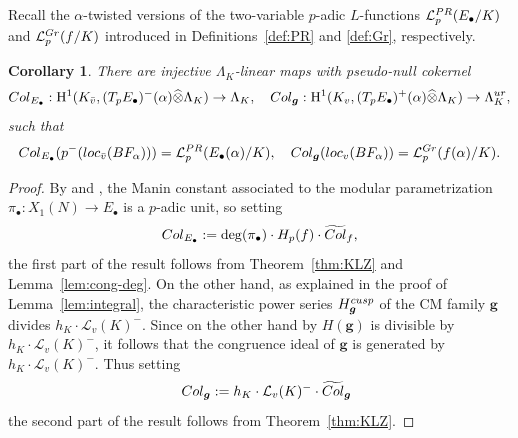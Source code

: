 \documentclass[a4paper,10pt]{amsart}
\numberwithin{equation}{section}
\numberwithin{equation}{section}
\theoremstyle{plain}
\theoremstyle{definition}
\newtheorem{defi}[thm]{Definition}
\theoremstyle{definition}
\theoremstyle{plain}
\theoremstyle{plain}
\theoremstyle{plain}
\newtheorem{cor}[thm]{Corollary}
\theoremstyle{plain}
\newcommand{\bg}{\boldsymbol{g}}
\newcommand{\Lcal}{\mathcal{L}}
\newcommand{\rH}{\mathrm{H}}
\begin{document}
 

%

Recall the $\alpha$-twisted versions of the two-variable $p$-adic $L$-functions $\Lcal_p^{\rm PR}(E_\bullet/K)$ and $\Lcal_p^{\rm Gr}(f/K)$ introduced in Definitions~\ref{def:PR} and \ref{def:Gr}, respectively.

\begin{cor}\label{cor:KLZ}
There are injective $\Lambda_K$-linear maps with pseudo-null cokernel 
\[
{\rm Col}_{E_\bullet}:\rH^1(K_{\bar{v}},(T_pE_\bullet)^-(\alpha)\widehat\otimes\Lambda_K)\to\Lambda_K,\quad
{\rm Col}_{\boldsymbol{g}}:\rH^1(K_{v},(T_pE_\bullet)^+(\alpha)\widehat\otimes\Lambda_K)\to\Lambda_K^{\rm ur},
\]
such that 
\[
{\rm Col}_{E_\bullet}(p^-({\rm loc}_{\bar v}(BF_{\alpha})))=\Lcal_p^{\rm PR}(E_\bullet(\alpha)/K),\quad{\rm Col}_{\boldsymbol{g}}({\rm loc}_{v}(BF_{\alpha}))=\Lcal_p^{\rm Gr}(f(\alpha)/K).
\]
\end{cor}

\begin{proof}
By \cite[Cor.~4.1]{mazur} and \cite[Prop.~3.3]{greenvats}, the Manin constant associated to the modular parametrization $\pi_\bullet:X_1(N)\rightarrow E_\bullet$ %
is a $p$-adic unit, so setting 
\[
{\rm Col}_{E_\bullet}:=\deg(\pi_{\bullet})\cdot H_p(f)\cdot\widetilde{\rm Col}_{f},
\]
the first part of the result follows from Theorem~\ref{thm:KLZ} and Lemma~\ref{lem:cong-deg}. On the other hand, as explained in the proof of Lemma~\ref{lem:integral}, the characteristic power series $H_{\bg}^{\rm cusp}$ of the CM family $\boldsymbol{g}$ divides $h_K\cdot\Lcal_v(K)^-$. Since on the other hand by \cite[Cor.~5.6]{hida-coates} $H(\boldsymbol{g})$ is divisible by $h_K\cdot\Lcal_v(K)^-$, it follows that the congruence ideal of $\boldsymbol{g}$ is generated by $h_K\cdot\Lcal_v(K)^-$. Thus setting 
\[
\quad{\rm Col}_{\boldsymbol{g}}:=h_K\cdot\Lcal_v(K)^-\cdot\widetilde{\rm Col}_{\boldsymbol{g}}
\] 
the second part of the result follows from %
Theorem~\ref{thm:KLZ}.
\end{proof}
\end{document}
